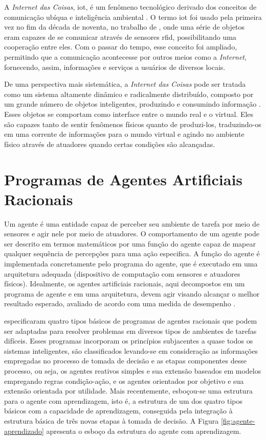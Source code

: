     A \textit{Internet das Coisas}, \acrfull{iot}, é um fenômeno tecnológico derivado dos conceitos de comunicação ubíqua e inteligência ambiental \cite{dohr2010internet}. O termo \acrlong{iot} foi usado pela primeira vez no fim da década de noventa, no trabalho de , onde uma série de objetos eram capazes de se comunicar através de sensores \acrshort{rfid}, possibilitando uma cooperação entre eles. Com o passar do tempo, esse conceito foi ampliado, permitindo que a comunicação acontecesse por outros meios como a \textit{Internet}, fornecendo, assim, informações e serviços a usuários de diversos locais.
    
    De uma perspectiva mais sistemática, a \textit{Internet das Coisas} pode ser tratada como um sistema altamente dinâmico e radicalmente distribuído, composto por um grande número de objetos inteligentes, produzindo e consumindo informação \cite{miorandi2012internet}.  Esses objetos se comportam como interface entre o mundo real e o virtual. Eles são capazes tanto de sentir fenômenos físicos quanto de produzi-los, traduzindo-os em uma corrente de informações para o mundo virtual e agindo no ambiente físico através de atuadores quando certas condições são alcançadas. 

\section{Programas de Agentes Artificiais Racionais}
\label{sec:agentes}

    Um agente é uma entidade capaz de perceber seu ambiente de tarefa por meio de sensores e agir nele por meio de atuadores. O comportamento de um agente pode ser descrito em termos matemáticos por uma função do agente capaz de mapear qualquer sequência de percepções para uma ação especifica. A função do agente é implementada concretamente pelo programa do agente, que é executado em uma arquitetura adequada (dispositivo de computação com sensores e atuadores físicos). Idealmente, os agentes artificiais racionais, aqui decompostos em um programa de agente e em uma arquitetura, devem agir visando alcançar o melhor resultado esperado, avaliado de acordo com uma medida de desempenho \cite{norvig2004inteligencia}.
    
     especificaram quatro tipos básicos de programas de agentes racionais que podem ser adaptadas para resolver problemas em diversos tipos de ambientes de tarefas difíceis. Esses programas incorporam os princípios subjacentes a quase todos os sistemas inteligentes, são classificados levando-se em consideração as informações empregadas no processo de tomada de decisão e as etapas componentes desse processo, ou seja, os agentes reativos simples e sua extensão baseados em modelos empregando regras condição-ação, e os agentes orientados por objetivo e sua extensão orientada por utilidade. Mais recentemente, esboçou-se uma estrutura para o agente com aprendizagem, isto é, a estrutura de um dos quatro tipos básicos com a capacidade de aprendizagem, conseguida pela integração à estrutura básica de três novas etapas à tomada de decisão. A Figura \ref{fig:agente-aprendizado} apresenta o esboço da estrutura do agente com aprendizagem.

